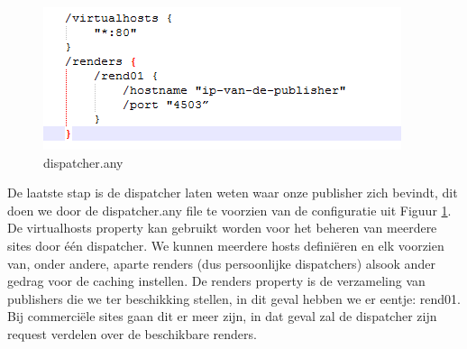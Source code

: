 	\par
	\begin{figure}[h!]
  		\includegraphics[]{images/dispatcher-any.PNG}
  		\caption{dispatcher.any}
  		\label{fig:dispatcher-any}
	\end{figure}
	De laatste stap is de dispatcher laten weten waar onze publisher zich bevindt, dit doen we door de dispatcher.any file te voorzien van de configuratie uit Figuur \ref{fig:dispatcher-any}. De \textquotedbl virtualhosts\textquotedbl{} property kan gebruikt worden voor het beheren van meerdere sites door één dispatcher. We kunnen meerdere hosts defini\"eren en elk voorzien van, onder andere, aparte renders (dus persoonlijke dispatchers) alsook ander gedrag voor de caching instellen. De \textquotedbl renders\textquotedbl{} property is de verzameling van publishers die we ter beschikking stellen, in dit geval hebben we er eentje: rend01. Bij commerci\"ele sites gaan dit er meer zijn, in dat geval zal de dispatcher zijn request verdelen over de beschikbare renders.
